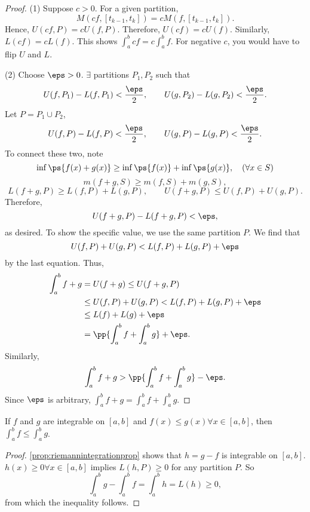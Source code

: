 \documentclass[11pt]{scrartcl}
\numberwithin{equation}{section}
\begin{document}
\begin{proof}
    (1) Suppose $c>0$. For a given partition, 
    \[
        M(cf, [t_{k-1},t_k]) = cM(f,[t_{k-1},t_k]).
    \] 
    Hence, $U(cf,P) = cU(f,P)$. Therefore, $U(cf) = cU(f)$.
    Similarly, $L(cf)=cL(f)$. This shows $\int_a^b cf = c\int_a^b f$.
    For negative $c$, you would have to flip $U$ and $L$.

    (2) Choose $\eps>0$. $\exists$ partitions $P_1,P_2$ such that 
    \[
        U(f,P_1) - L(f,P_1) < \frac{\eps}{2}, \qquad U(g,P_2) - L(g,P_2) < \frac{\eps}{2}.
    \]
    Let $P = P_1\cup P_2$,
    \[
        U(f,P)-L(f,P) < \frac{\eps}{2}, \qquad U(g,P)-L(g,P) < \frac{\eps}{2}.
    \]
    To connect these two, note 
    \[
        \inf\ps{f(x)+g(x)} \geq \inf\ps{f(x)} + \inf\ps{g(x)},\quad (\forall x\in S)
    \]
    \[
        m(f+g,S) \geq m(f,S) + m(g,S),
    \]
    \[
        L(f+g,P) \geq L(f,P)+ L(g,P), \qquad U(f+g,P) \leq U(f,P)+U(g,P).
    \]
    Therefore, 
    \[
        U(f+g,P) - L(f+g,P) < \eps,
    \]
    as desired.
    To show the specific value, we use the same partition $P$.
    We find that 
    \[
        U(f,P) + U(g,P) < L(f,P) + L(g,P) + \eps
    \]
    by the last equation. Thus,
    \begin{align*}
        \int_a^b f+g &= U(f+g) \leq U(f+g,P) \\
        &\leq U(f,P)+U(g,P) < L(f,P) + L(g,P) + \eps \\
        &\leq L(f) + L(g) + \eps \\
        &= \pp{\int_a^b f + \int_a^b g} +\eps.
    \end{align*}
    Similarly, 
    \[
        \int_a^b f+g > \pp{\int_a^b f + \int_a^b g} - \eps.
    \]
    Since $\eps$ is arbitrary, $\int_a^b f+g = \int_a^b f+\int_a^b g$.
\end{proof}

\begin{proposition}
    \label{prop:integralfunctioninequality}
    If $f$ and $g$ are integrable on $[a,b]$ and $f(x)\leq g(x) \forall x\in[a,b]$, then $\int_a^bf\leq\int_a^bg$.
\end{proposition}

\begin{proof}
    \cref{prop:riemannintegrationprop} shows that $h=g-f$ is integrable on 
    $[a,b]$. $h(x)\geq 0 \forall x\in[a,b]$ implies $L(h,P)\geq 0$ for any 
    partition $P$. So
    \[
        \int_a^bg - \int_a^b f = \int_a^b h = L(h) \geq 0,
    \]
    from which the inequality follows.
\end{proof}
\end{document}

